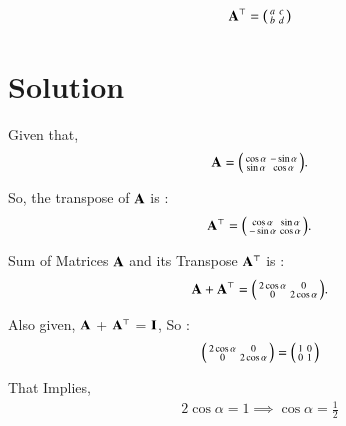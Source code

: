 \documentclass[journal,12pt,twocolumn]{IEEEtran}
\begin{document}
\begin{align}
    \mathbf{A}^\top = \begin{psmallmatrix} a & c\\ b & d \end{psmallmatrix}
\end{align}


\section{Solution}


Given that, 
\begin{align}
 \mathbf{A}  = \begin{psmallmatrix} \cos{\alpha} & -\sin{\alpha}\\ \sin{\alpha} & \cos{\alpha} \end{psmallmatrix}.    
\end{align}

So, the transpose of $\mathbf{A}$ is :
\begin{align}
 \mathbf{A}^\top  = \begin{psmallmatrix} \cos{\alpha} & \sin{\alpha}\\ -\sin{\alpha} & \cos{\alpha} \end{psmallmatrix}.    
\end{align}

Sum of Matrices $\mathbf{A}$ and its Transpose $\mathbf{A}^\top$ is :
\begin{align}
 \mathbf{A} + \mathbf{A}^\top  = \begin{psmallmatrix} 2\cos{\alpha} & 0 \\ 0  & 2\cos{\alpha} \end{psmallmatrix}.    
\end{align}

Also given, $\mathbf{A}$ + $\mathbf{A}^\top$ = $\mathbf{I}$, So :
\begin{align}
\begin{psmallmatrix} 2\cos{\alpha} & 0 \\ 0  & 2\cos{\alpha} \end{psmallmatrix} =  \begin{psmallmatrix} 1 & 0 \\ 0  & 1 \end{psmallmatrix}
\end{align} 

That Implies, 
\begin{align}
 2\cos{\alpha} = 1 \implies \cos{\alpha} = \frac{1}{2}   
\end{align}
\end{document}
